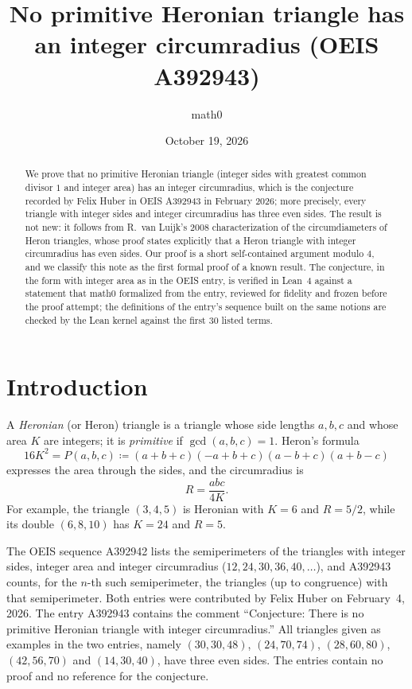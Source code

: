 \documentclass[11pt]{amsart}
\title[Heronian triangles with integer circumradius]{No primitive Heronian triangle has an integer circumradius (OEIS A392943)}
\author{math0}
\date{October 19, 2026}
\theoremstyle{plain}
\theoremstyle{definition}
\begin{document}
\begin{abstract}
We prove that no primitive Heronian triangle (integer sides with greatest common divisor $1$ and integer area) has an integer circumradius, which is the conjecture recorded by Felix Huber in OEIS A392943 in February 2026; more precisely, every triangle with integer sides and integer circumradius has three even sides.
The result is not new: it follows from R.~van Luijk's 2008 characterization of the circumdiameters of Heron triangles, whose proof states explicitly that a Heron triangle with integer circumradius has even sides. Our proof is a short self-contained argument modulo $4$, and we classify this note as the first formal proof of a known result.
The conjecture, in the form with integer area as in the OEIS entry, is verified in Lean~4 against a statement that math0 formalized from the entry, reviewed for fidelity and frozen before the proof attempt; the definitions of the entry's sequence built on the same notions are checked by the Lean kernel against the first $30$ listed terms.
\end{abstract}
\maketitle

\section{Introduction}

A \emph{Heronian} (or Heron) triangle is a triangle whose side lengths $a,b,c$ and whose area $K$ are integers; it is \emph{primitive} if $\gcd(a,b,c)=1$. Heron's formula
\begin{equation}\label{eq:heron}
  16K^2=P(a,b,c)\coloneqq(a+b+c)(-a+b+c)(a-b+c)(a+b-c)
\end{equation}
expresses the area through the sides, and the circumradius is
\begin{equation}\label{eq:circ}
  R=\frac{abc}{4K}.
\end{equation}
For example, the triangle $(3,4,5)$ is Heronian with $K=6$ and $R=5/2$, while its double $(6,8,10)$ has $K=24$ and $R=5$.

The OEIS sequence A392942 \cite{A392942} lists the semiperimeters of the triangles with integer sides, integer area and integer circumradius ($12,24,30,36,40,\dots$), and A392943 \cite{A392943} counts, for the $n$-th such semiperimeter, the triangles (up to congruence) with that semiperimeter. Both entries were contributed by Felix Huber on February~4, 2026. The entry A392943 contains the comment ``Conjecture: There is no primitive Heronian triangle with integer circumradius.'' All triangles given as examples in the two entries, namely $(30,30,48)$, $(24,70,74)$, $(28,60,80)$, $(42,56,70)$ and $(14,30,40)$, have three even sides. The entries contain no proof and no reference for the conjecture.
\end{document}
